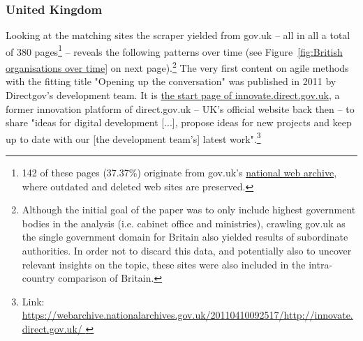 \subsubsection{United Kingdom} 
Looking at the matching sites the scraper yielded from gov.uk – all in all a total of 380 pages\footnote{142 of these pages (37.37\%) originate from gov.uk's \href{https://webarchive.nationalarchives.gov.uk/search/}{national web archive}, where outdated and deleted web sites are preserved.} – reveals the following patterns over time (see Figure~\ref{fig:British organisations over time} on next page).\footnote{Although the initial goal of the paper was to only include highest government bodies in the analysis (i.e. cabinet office and ministries), crawling gov.uk as the single government domain for Britain also yielded results of subordinate authorities. In order not to discard this data, and potentially also to uncover relevant insights on the topic, these sites were also included in the intra-country comparison of Britain.} The very first content on agile methods with the fitting title "Opening up the conversation" was published in 2011 by Directgov's development team. It is \href{https://webarchive.nationalarchives.gov.uk/20110410092517/http://innovate.direct.gov.uk/
}{the start page of innovate.direct.gov.uk}, a former innovation platform of direct.gov.uk – UK's official website back then – to share "ideas for digital development [...], propose ideas for new projects and keep up to date with our [the development team's] latest work".\footnote{Link: \url{https://webarchive.nationalarchives.gov.uk/20110410092517/http://innovate.direct.gov.uk/
}}
